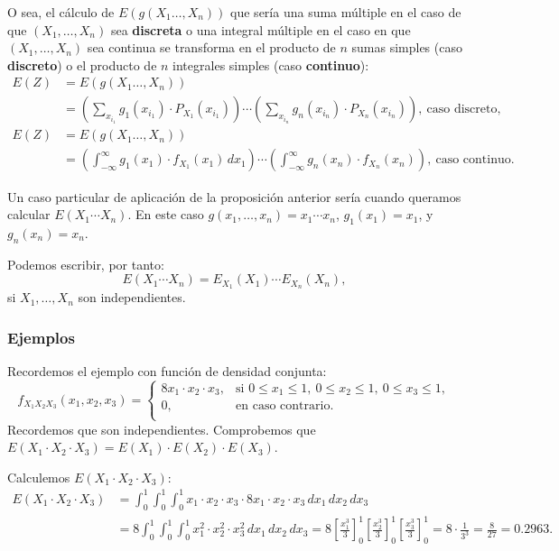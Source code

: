 \documentclass[]{book}
\begin{document}
O sea, el cálculo de \(E(g(X_1\ldots,X_n))\) que sería una suma múltiple en el caso de que \((X_1,\ldots,X_n)\) sea \textbf{discreta} o una integral múltiple en el caso en que \((X_1,\ldots,X_n)\) sea continua se transforma en el producto de \(n\) sumas simples (caso \textbf{discreto}) o el producto de \(n\) integrales simples (caso \textbf{continuo}):
\[
\begin{array}{rl}
E(Z) & =E(g(X_1\ldots,X_n))\\ & =\left(\sum_{x_{i_1}} g_1(x_{i_1})\cdot P_{X_1}(x_{i_1})\right)\cdots \left(\sum_{x_{i_n}} g_n(x_{i_n})\cdot P_{X_n}(x_{i_n})\right), \ \mbox{caso discreto},\\
E(Z) & =E(g(X_1\ldots,X_n)) \\ & =\left(\int_{-\infty}^\infty g_1(x_1)\cdot f_{X_1}(x_1)\, dx_1\right)\cdots \left(\int_{-\infty}^\infty g_n(x_n)\cdot f_{X_n}(x_n)\right), \ \mbox{caso continuo}.
\end{array}
\]

Un caso particular de aplicación de la proposición anterior sería cuando queramos calcular \(E(X_1\cdots X_n)\). En este caso \(g(x_1,\ldots,x_n)=x_1\cdots x_n\), \(g_1(x_1)=x_1\), y \(g_n(x_n)=x_n\).

Podemos escribir, por tanto:
\[
E(X_1\cdots X_n)=E_{X_1}(X_1)\cdots E_{X_n}(X_n),
\]
si \(X_1,\ldots,X_n\) son independientes.

\hypertarget{ejemplos-22}{%
\subsubsection{Ejemplos}\label{ejemplos-22}}

Recordemos el ejemplo con función de densidad conjunta:
\[
f_{X_1X_2X_3}(x_1,x_2,x_3)=\begin{cases}
8 x_1\cdot x_2\cdot x_3, & \mbox{si }0\leq x_1\leq 1,\ 0\leq x_2\leq 1,\ 0\leq x_3\leq 1, \\
0, & \mbox{en caso contrario.}\\
\end{cases}
\]
Recordemos que son independientes. Comprobemos que \(E(X_1\cdot X_2\cdot X_3)=E(X_1)\cdot E(X_2)\cdot E(X_3)\).

Calculemos \(E(X_1\cdot X_2\cdot X_3)\):
\[
\begin{array}{rl}
E(X_1\cdot X_2\cdot X_3)  & = \int_0^1\int_0^1\int_0^1 x_1\cdot x_2\cdot x_3\cdot 8 x_1\cdot x_2\cdot x_3\,dx_1\, dx_2\, dx_3 \\ & = 8\int_0^1\int_0^1\int_0^1 x_1^2\cdot x_2^2\cdot x_3^2\,dx_1\, dx_2\, dx_3 =8\left[\frac{x_1^3}{3}\right]_0^1\left[\frac{x_2^3}{3}\right]_0^1
\left[\frac{x_3^3}{3}\right]_0^1 = 8\cdot \frac{1}{3^3}=\frac{8}{27}=0.2963.
\end{array}
\]
\end{document}
